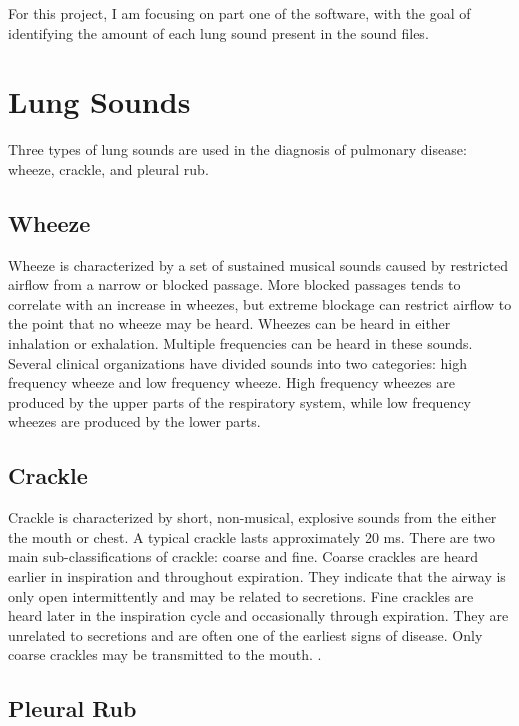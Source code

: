 \documentclass{article}
\begin{document}
  For this project, I am focusing on part one of the software, with the goal of identifying the amount of each lung sound present in the sound files.\\
  
\section{Lung Sounds}

Three types of lung sounds are used in the diagnosis of pulmonary disease: wheeze, crackle, and pleural rub. 

\subsection{Wheeze}

Wheeze is characterized by a set of sustained musical sounds caused by restricted airflow from a narrow or blocked passage. More blocked passages tends to correlate with an increase in wheezes, but extreme blockage can restrict airflow to the point that no wheeze may be heard. Wheezes can be heard in either inhalation or exhalation. Multiple frequencies can be heard in these sounds.  Several clinical organizations have divided sounds into  two categories: high frequency wheeze and low frequency wheeze. High frequency wheezes are produced by the upper parts of the respiratory system, while low frequency wheezes are produced by the lower parts. 

\subsection{Crackle}

Crackle is characterized by short, non-musical, explosive sounds from the either the mouth or chest. A typical crackle lasts approximately 20 ms. There are two main sub-classifications of crackle: coarse and fine. Coarse crackles are heard earlier in inspiration and throughout expiration. They indicate that the airway is only open intermittently and may be related to secretions. Fine crackles are heard later in the inspiration cycle and occasionally through expiration. They are unrelated to secretions and are often one of the earliest signs of disease. Only coarse crackles may be transmitted to the mouth. \cite{Yi MEng, NEJoM}.

\subsection{Pleural Rub}
\end{document}

